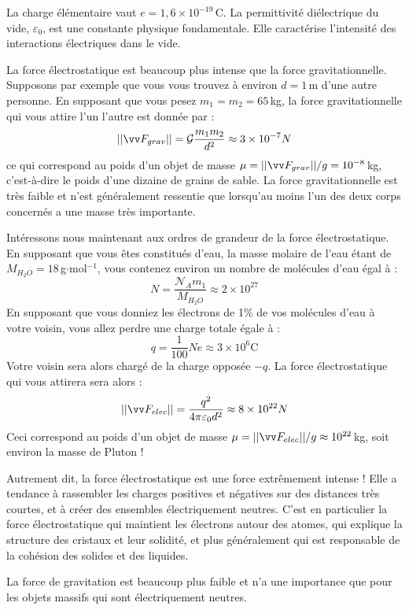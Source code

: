 \documentclass[11pt,fleqn]{book} %
\begin{document}
\begin{encart}

La charge élémentaire vaut $e = 1,6 \times 10^{-19}$\,C. La permittivité diélectrique du vide, $\varepsilon_0$, est une constante physique fondamentale. Elle caractérise l'intensité des interactions électriques dans le vide. 

La force électrostatique est beaucoup plus intense que la force gravitationnelle. Supposons par exemple que vous vous trouvez à environ $d=1$\,m d'une autre personne. En supposant que vous pesez $m_1 = m_2 = 65$\,kg, la force gravitationnelle qui vous attire l'un l'autre est donnée par :
\begin{equation}
    || \vv F_{grav} || = \mathcal{G} \frac{m_1 m_2}{d^2} \approx 3 \times 10^{-7} N
\end{equation}
ce qui correspond au poids d'un objet de masse $\mu = || \vv F_{grav} ||/g = 10^{-8}$\,kg, c'est-à-dire le poids d'une dizaine de grains de sable. La force gravitationnelle est très faible et n'est généralement ressentie que lorsqu'au moins l'un des deux corps concernés a une masse très importante.

Intéressons nous maintenant aux ordres de grandeur de la force électrostatique. En supposant que vous êtes constitués d'eau, la masse molaire de l'eau étant de  $M_{H_2 O} =18$\,g$\cdot$mol$^{-1}$, vous contenez environ un nombre de molécules d'eau égal à :
\begin{equation}
    N = \frac{\mathcal{N}_A m_1}{M_{H_2 O}} \approx 2 \times 10^{27}
\end{equation}
En supposant que vous donniez les électrons de 1\% de vos molécules d'eau à votre voisin, vous allez perdre une charge totale égale à :
\begin{equation}
    q = \frac{1}{100} N e \approx 3 \times 10^6 \mathrm{C}
\end{equation}
Votre voisin sera alors chargé de la charge opposée $-q$. La force électrostatique qui vous attirera sera alors :
\begin{equation}
    || \vv F_{elec} || =  \frac{q^2}{4 \pi \varepsilon_0 d^2} \approx 8 \times 10^{22} N
\end{equation}
Ceci correspond au poids d'un objet de masse $\mu = || \vv F_{elec} ||/g \approx 10^{22}$\,kg, soit environ la masse de Pluton !

Autrement dit, la force électrostatique est une force extrêmement intense ! Elle a tendance à rassembler les charges positives et négatives sur des distances très courtes, et à créer des ensembles électriquement neutres. C'est en particulier la force électrostatique qui maintient les électrons autour des atomes, qui explique la structure des cristaux et leur solidité, et plus généralement qui est responsable de la cohésion des solides et des liquides. 

La force de gravitation est beaucoup plus faible et n'a une importance que pour les objets massifs qui sont électriquement neutres.
\end{encart}
\end{document}
